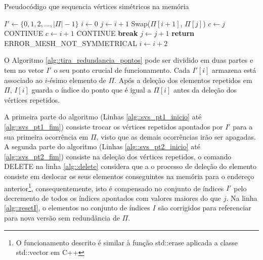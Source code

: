 \documentclass[
    12pt,                %
    oneside,            %
    a4paper,            %
    english,            %
    french,                %
    spanish,            %
    brazil                %
    ]{abntex2}
\begin{document}
 \begin{algorithm}
 \caption{Pseudocódigo que sequencia vértices simétricos na memória}
 \label{alg::reordena_simetricos}
 \begin{algorithmic}[1]
 \State $I' \gets \{0, 1, 2, ..., |\Pi| - 1\}$
 \State $i \gets 0$
     \State $j \gets i + 1$
         \If {$\Pi[i] = -\Pi[j]$}
             \State Swap($\Pi[i+1]$, $\Pi[j]$) \label{alg::troca}
              \label{alg::compensacao_inicio}
                    \State $c \gets j$
                    \State CONTINUE
                    \State $c \gets i+1$
                    \State CONTINUE
                \EndIf
             \EndFor
             \State \textbf{break}
         \EndIf 
         \State $j \gets j + 1$
            \State \textbf{return} ERROR\_MESH\_NOT\_SYMMETRICAL
         \EndIf
     \EndWhile \label{alg::compensacao_fim}
     \State $i \gets i + 2$
\EndWhile
 \EndProcedure
 \end{algorithmic}
 \end{algorithm}
 
 O Algoritmo \ref{alg::tira_redundancia_pontos} pode ser dividido em duas partes e tem no vetor $I'$ o seu ponto crucial de funcionamento. Cada $I'[i]$ armazena está associado ao $i$-ésimo elemento de $\Pi$. Após a deleção dos elementos repetidos em $\Pi$, $I[i]$ guarda o índice do ponto que é igual a $\Pi[i]$ antes da deleção dos vértices repetidos.
 
 A primeira parte do algoritmo (Linhas \ref{alg::svs_pt1_inicio} até \ref{alg::svs_pt1_fim}) consiste trocar os vértices repetidos apontados por $I'$ para a sua primeira ocorrência em $\Pi$, visto que as demais ocorrências irão ser apagadas. A segunda parte do algoritmo (Linhas \ref{alg::svs_pt2_inicio} até \ref{alg::svs_pt2_fim}) consiste na deleção dos vértices repetidos, o comando DELETE na linha \ref{alg::delete} considera que a o processo de deleção do elemento consiste em deslocar os seus elementos conseguintes na memória para o endereço anterior\footnote{O funcionamento descrito é similar à função std::erase aplicada a classe std::vector em C++}, consequentemente, isto é compensado no conjunto de índices $I'$ pelo decremento de todos os índices apontados com valores maiores do que $j$. Na linha \ref{alg::resetI}, o elementos no conjunto de índices $I$ são corrigidos para referenciar para nova versão sem redundância de $\Pi$.
 
\end{document}
